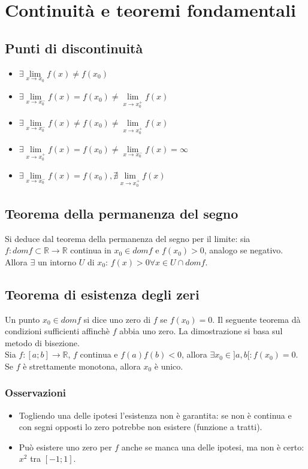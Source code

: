 \chapter{Continuit\`a e teoremi fondamentali}
\section{Punti di discontinuit\`a}
\begin{itemize}
\item $\exists\lim\limits_{x\rightarrow x_0}f(x)\neq f(x_0)$
\item $\exists\lim\limits_{x\rightarrow x_0^-}f(x)=f(x_0)\neq\lim\limits_{x\rightarrow x_0^+}f(x)$
\item $\exists\lim\limits_{x\rightarrow x_0^-}f(x)\neq f(x_0)\neq\lim\limits_{x\rightarrow x_0^+}f(x)$
\item $\exists\lim\limits_{x\rightarrow x_0^+}f(x)=f(x_0)\neq\lim\limits_{x\rightarrow x_0^-}f(x)=\infty$
\item $\exists\lim\limits_{x\rightarrow x_0^-}f(x)=f(x_0),\nexists\lim\limits_{x\rightarrow x_0^+}f(x)$
\end{itemize}
\section{Teorema della permanenza del segno}
Si deduce dal teorema della permanenza del segno per il limite: sia $f:domf\subset\mathbb{R}\rightarrow\mathbb{R}$ continua in $x_0\in domf$ e $f(x_0)>0$, analogo se 
negativo. Allora $\exists$ un intorno $U$ di $x_0$: $f(x)>0\forall x\in U\cap domf$.
\section{Teorema di esistenza degli zeri}
Un punto $x_0\in domf$ si dice uno zero di $f$ se $f(x_0)=0$. Il seguente teorema d\`a condizioni sufficienti affinch\`e $f$ abbia uno zero. La dimostrazione si basa sul 
metodo di bisezione.\\
Sia $f:[a;b]\rightarrow\mathbb{R}$, $f$ continua e $f(a)f(b)<0$, allora $\exists x_0\in]a,b[:f(x_0)=0$.\\
Se $f$ \`e strettamente monotona, allora $x_0$ \`e unico.
\subsection{Osservazioni}
\begin{itemize}
\item Togliendo una delle ipotesi l'esistenza non \`e garantita: se non \`e continua e con segni opposti lo zero potrebbe non esistere (funzione a tratti).
\item Pu\`o esistere uno zero per $f$ anche se manca una delle ipotesi, ma non \`e certo: $x^2$ tra $[-1;1]$.
\end{itemize}
